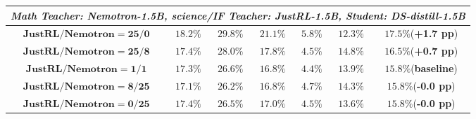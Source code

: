 \begin{table}[htbp]
{\begin{tabular}{c|ccccc|c}
\midrule
\midrule
\multicolumn{7}{c}{\textbf{\textit{Math Teacher: Nemotron-1.5B, science/IF Teacher: JustRL-1.5B, Student: DS-distill-1.5B}}} \\
\midrule

$\mathbf{\text{JustRL}/\text{Nemotron}=25/0}$ & $18.2\%$ & $29.8\%$ & $21.1\%$ & $5.8\%$ & $12.3\%$ & $17.5\%${\footnotesize \textcolor{green!60!black}{(\textbf{+1.7 pp})}} \\
$\mathbf{\text{JustRL}/\text{Nemotron}=25/8}$ & $17.4\%$ & $28.0\%$ & $17.8\%$ & $4.5\%$ & $14.8\%$ & $16.5\%${\footnotesize \textcolor{green!60!black}{(\textbf{+0.7 pp})}} \\
$\mathbf{\text{JustRL}/\text{Nemotron}=1/1}$ & $17.3\%$ & $26.6\%$ & $16.8\%$ & $4.4\%$ & $13.9\%$ & $15.8\%${\footnotesize \textcolor{black!60!black}{(\textbf{baseline})}} \\
$\mathbf{\text{JustRL}/\text{Nemotron}=8/25}$  & $17.1\%$ & $26.2\%$ & $16.8\%$ & $4.7\%$ & $14.3\%$ & $15.8\%${\footnotesize \textcolor{gray!60!black}{(\textbf{-0.0 pp})}} \\
$\mathbf{\text{JustRL}/\text{Nemotron}=0/25}$ & $17.4\%$ & $26.5\%$ & $17.0\%$ & $4.5\%$ & $13.6\%$ & $15.8\%${\footnotesize \textcolor{gray!60!black}{(\textbf{-0.0 pp})}} \\
\bottomrule
\end{tabular}%
}
\end{table}